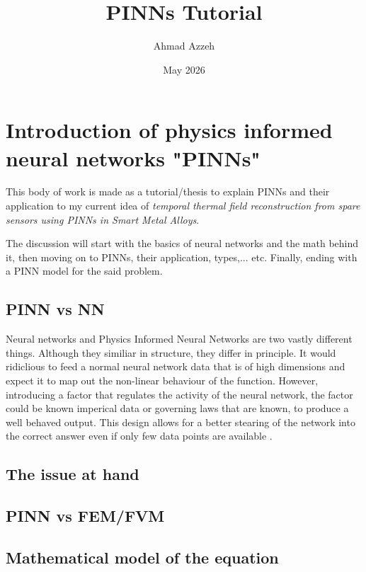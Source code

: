 \documentclass[12pt, a4paper]{article}
\title{PINNs Tutorial}
\author{Ahmad Azzeh}
\date{May 2026}
\begin{document}
\maketitle
\tableofcontents
\newpage




\section{Introduction of physics informed neural networks  "PINNs" }


This body of work is made as a tutorial/thesis to explain PINNs and their application to my current idea of \textit{temporal thermal field reconstruction from spare sensors using PINNs in Smart Metal Alloys}. 

The discussion will start with the basics of neural networks and the math behind it, then moving on to PINNs, their application, types,... etc. Finally, ending with a PINN model for the said problem.



\subsection{PINN vs NN}


Neural networks and Physics Informed Neural Networks are two vastly different things. Although they similiar in structure, they differ in principle. It would ridiclious to feed a normal neural network data that is of high dimensions and expect it to map out the non-linear behaviour of the function. However, introducing a factor that regulates the activity of the neural network, the factor could be known imperical data or governing laws that are known, to produce a well behaved output. This design allows for a better stearing of the network into the correct answer even if only few data points are available \citep{raissi2019}.



\subsection{The issue at hand}

\subsection{PINN vs FEM/FVM}

\subsection{Mathematical model of the equation}
\end{document}
